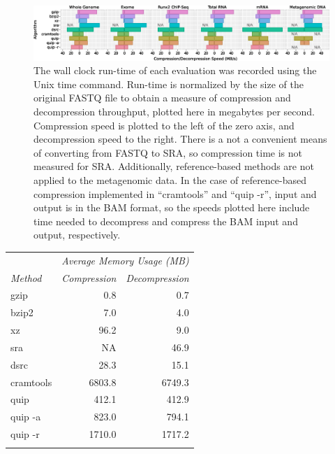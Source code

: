 \documentclass[a4,center,fleqn]{NAR}
\begin{document}
\begin{figure}
\centerline{\includegraphics[width=\textwidth]{comp_decomp_time.eps}}
\caption{
The wall clock run-time of each evaluation was recorded using the Unix time
command. Run-time is normalized by the size of the original FASTQ file to
obtain a measure of compression and decompression throughput, plotted here in megabytes
per second. Compression speed is plotted to the left of the zero axis, and
decompression speed to the right. There is a not a convenient means of
converting from FASTQ to SRA, so compression time is not measured for SRA.
Additionally, reference-based methods are not applied to the metagenomic data.
In the case of reference-based compression implemented in ``cramtools'' and
``quip -r'', input and output is in the BAM format, so the speeds plotted here
include time needed to decompress and compress the BAM input and output,
respectively.
}
\label{fig:comp_decomp_time}
\end{figure}



\begin{table}[h]
{
\begin{tabular}{@{}lrr@{}}
\toprule
                & \multicolumn{2}{c}{\textit{Average Memory Usage (MB)}} \\ \cline{2-3}
\textit{Method} & \textit{Compression} & \textit{Decompression} \\ \colrule
gzip            &     0.8              &    0.7 \\
bzip2           &     7.0              &    4.0 \\
xz              &    96.2              &    9.0 \\
sra             &      NA              &   46.9 \\
dsrc            &    28.3              &   15.1 \\
cramtools       &  6803.8              & 6749.3 \\
quip            &   412.1              &  412.9 \\
quip -a         &   823.0              &  794.1 \\
quip -r         &  1710.0              & 1717.2 \\ \botrule
\end{tabular}
}
{}
\end{table}
\end{document}
